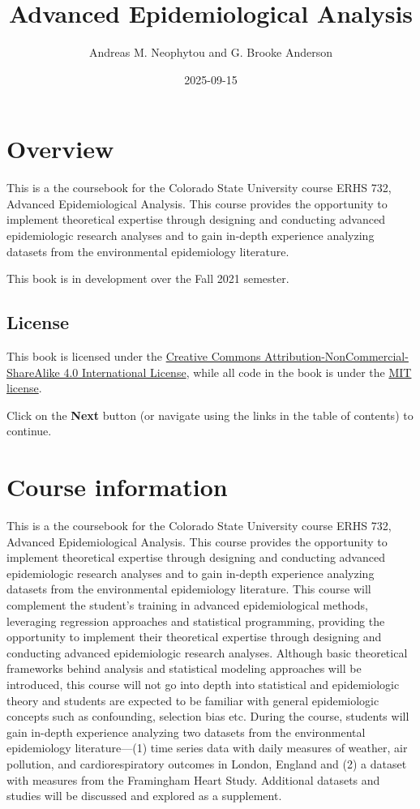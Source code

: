 \documentclass[
]{book}
\title{Advanced Epidemiological Analysis}
\author{Andreas M. Neophytou and G. Brooke Anderson}
\date{2025-09-15}
\begin{document}
\maketitle

{
\setcounter{tocdepth}{1}
\tableofcontents
}
\chapter{Overview}\label{overview}

This is a the coursebook for the Colorado State University course ERHS 732,
Advanced Epidemiological Analysis. This course provides the opportunity to
implement theoretical expertise through designing and conducting advanced
epidemiologic research analyses and to gain in-depth experience analyzing
datasets from the environmental epidemiology literature.

This book is in development over the Fall 2021 semester.

\section{License}\label{license}

This book is licensed under the \href{https://creativecommons.org/licenses/by-nc-sa/4.0/}{Creative Commons
Attribution-NonCommercial-ShareAlike 4.0 International
License}, while all code in
the book is under the \href{https://opensource.org/licenses/MIT}{MIT license}.

Click on the \textbf{Next} button (or navigate using the links in the table of
contents) to continue.

\chapter{Course information}\label{courseinfo}

This is a the coursebook for the Colorado State University course ERHS 732,
Advanced Epidemiological Analysis. This course provides the opportunity to
implement theoretical expertise through designing and conducting advanced
epidemiologic research analyses and to gain in-depth experience analyzing
datasets from the environmental epidemiology literature. This course will
complement the student's training in advanced epidemiological methods,
leveraging regression approaches and statistical programming, providing the
opportunity to implement their theoretical expertise through designing and
conducting advanced epidemiologic research analyses. Although basic theoretical frameworks behind analysis and statistical modeling approaches will be introduced, this course will not go into depth into statistical and epidemiologic theory and students are expected to be familiar with general epidemiologic concepts such as confounding, selection bias etc. During the course,
students will gain in-depth experience analyzing two datasets from the
environmental epidemiology literature---(1) time series data with daily measures
of weather, air pollution, and cardiorespiratory outcomes in London, England and
(2) a dataset with measures from the Framingham Heart Study. Additional datasets
and studies will be discussed and explored as a supplement.
\end{document}
